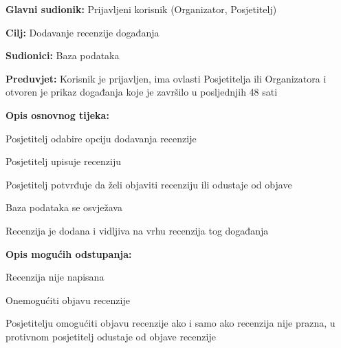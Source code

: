 
					\noindent {}
					\begin{packed_item}
						
						\item \textbf{Glavni sudionik:} Prijavljeni korisnik (Organizator, Posjetitelj)
						\item  \textbf{Cilj:} Dodavanje recenzije događanja
						\item  \textbf{Sudionici:} Baza podataka
						\item  \textbf{Preduvjet:} Korisnik je prijavljen, ima ovlasti Posjetitelja ili Organizatora i otvoren je prikaz događanja koje je završilo u posljednjih 48 sati
						\item  \textbf{Opis osnovnog tijeka:}
						
						\item[] \begin{packed_enum}
							
							\item Posjetitelj odabire opciju dodavanja recenzije
							\item Posjetitelj upisuje recenziju
							\item Posjetitelj potvrđuje da želi objaviti recenziju ili odustaje od objave
							\item Baza podataka se osvježava
							\item Recenzija je dodana i vidljiva na vrhu recenzija tog događanja

						\end{packed_enum}
						
						\item  \textbf{Opis mogućih odstupanja:}
						
						\item[] \begin{packed_item}
							
							\item[2.a] Recenzija nije napisana 
							\item[] \begin{packed_enum}
								
								\item Onemogućiti objavu recenzije 
								\item Posjetitelju omogućiti objavu recenzije ako i samo ako recenzija nije prazna, u protivnom posjetitelj odustaje od objave recenzije
								
							\end{packed_enum}		
						\end{packed_item}
						
					\end{packed_item}
					
